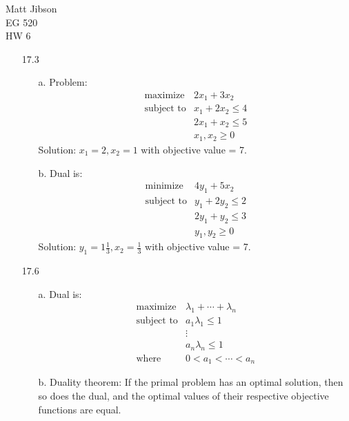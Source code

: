 \documentclass{article}
\begin{document}
\begin{flushright}
Matt Jibson \\
EG 520 \\
HW 6
\end{flushright}

\begin{itemize}
	\item[17.3]
		\begin{enumerate}
			\item[a.] Problem:
				\begin{displaymath}
					\begin{array}{rl}
						\textrm{maximize} & 2x_1 + 3x_2 \\
						\textrm{subject to} & x_1 + 2x_2 \le 4 \\
						& 2x_1 + x_2 \le 5 \\
						& x_1, x_2 \ge 0
					\end{array}
				\end{displaymath}
				Solution: $x_1 = 2, x_2 = 1$ with objective value = 7.
			\item[b.] Dual is:
				\begin{displaymath}
					\begin{array}{rl}
						\textrm{minimize} & 4y_1 + 5x_2 \\
						\textrm{subject to} & y_1 + 2y_2 \le 2 \\
						& 2y_1 + y_2 \le 3 \\
						& y_1, y_2 \ge 0
					\end{array}
				\end{displaymath}
				Solution: $y_1 = 1 \frac{1}{3}, x_2 = \frac{1}{3}$ with objective value = 7.
		\end{enumerate}
	\item[17.6]
		\begin{enumerate}
			\item[a.] Dual is:
				\begin{displaymath}
					\begin{array}{rl}
						\textrm{maximize} & \lambda_1 + \cdots + \lambda_n \\
						\textrm{subject to} & a_1 \lambda_1 \le 1 \\
						& \vdots \\
						& a_n \lambda_n \le 1 \\
						\textrm{where} & 0 < a_1 < \cdots < a_n
					\end{array}
				\end{displaymath}
			\item[b.] Duality theorem: If the primal problem has an optimal solution, then so does the dual, and the optimal values of their respective objective functions are equal.

\end{enumerate}
\end{itemize}
\end{document}
